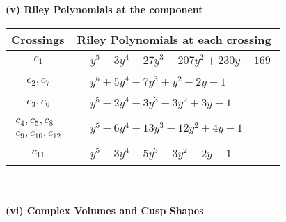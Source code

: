 \documentclass[1p]{elsarticle_modified}
\theoremstyle{definition}
\begin{document}
\newpage\renewcommand{\arraystretch}{1}
\flushleft \textbf{(v) Riley Polynomials at the component}\newline \\
\begin{tabular}{m{50pt}|m{274pt}}
Crossings & \hspace{64pt}Riley Polynomials at each crossing \\
\hline $$\begin{aligned}c_{1}\end{aligned}$$&$\begin{aligned}
&y^5-3 y^4+27 y^3-207 y^2+230 y-169
\end{aligned}$\\
\hline $$\begin{aligned}c_{2},c_{7}\end{aligned}$$&$\begin{aligned}
&y^5+5 y^4+7 y^3+y^2-2 y-1
\end{aligned}$\\
\hline $$\begin{aligned}c_{3},c_{6}\end{aligned}$$&$\begin{aligned}
&y^5-2 y^4+3 y^3-3 y^2+3 y-1
\end{aligned}$\\
\hline $$\begin{aligned}c_{4},c_{5},c_{8}\\c_{9},c_{10},c_{12}\end{aligned}$$&$\begin{aligned}
&y^5-6 y^4+13 y^3-12 y^2+4 y-1
\end{aligned}$\\
\hline $$\begin{aligned}c_{11}\end{aligned}$$&$\begin{aligned}
&y^5-3 y^4-5 y^3-3 y^2-2 y-1
\end{aligned}$\\
\hline
\end{tabular}\\~\\
\newpage\flushleft \textbf{(vi) Complex Volumes and Cusp Shapes}
\end{document}
